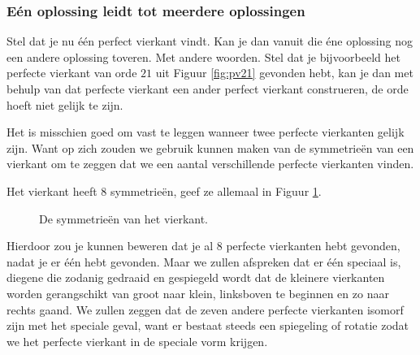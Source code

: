 \subsubsection{Eén oplossing leidt tot meerdere oplossingen}

Stel dat je nu één perfect vierkant vindt. Kan je dan vanuit die éne oplossing nog een andere oplossing toveren. Met andere woorden. Stel dat je bijvoorbeeld het perfecte vierkant van orde $21$ uit Figuur \ref{fig:pv21} gevonden hebt, kan je dan met behulp van dat perfecte vierkant een ander perfect vierkant construeren, de orde hoeft niet gelijk te zijn.

Het is misschien goed om vast te leggen wanneer twee perfecte vierkanten gelijk zijn. Want op zich zouden we gebruik kunnen maken van de symmetrieën van een vierkant om te zeggen dat we een aantal verschillende perfecte vierkanten vinden.

Het vierkant heeft 8 symmetrieën, geef ze allemaal in Figuur \ref{fig:symmetrie_vierkant}.

\begin{figure}[ht]
  \centering
  



  \caption{De symmetrieën van het vierkant.}
  \label{fig:symmetrie_vierkant}
\end{figure}


\clearpage

Hierdoor zou je kunnen beweren dat je al $8$ perfecte vierkanten hebt gevonden, nadat je er één hebt gevonden. Maar we zullen afspreken dat er één speciaal is, diegene die zodanig gedraaid en gespiegeld wordt dat de kleinere vierkanten worden gerangschikt van groot naar klein, linksboven te beginnen en zo naar rechts gaand. We zullen zeggen dat de zeven andere perfecte vierkanten isomorf zijn met het speciale geval, want er bestaat steeds een spiegeling of rotatie zodat we het perfecte vierkant in de speciale vorm krijgen.

